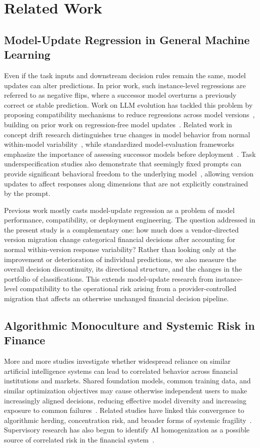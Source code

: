 \documentclass{ieeeaccess}
\begin{document}
\section{Related Work}
\subsection{Model-Update Regression in General Machine Learning}
Even if the task inputs and downstream decision rules remain the same, model updates can alter predictions. In prior work, such instance-level regressions are referred to as negative flips, where a successor model overturns a previously correct or stable prediction. Work on LLM evolution has tackled this problem by proposing compatibility mechanisms to reduce regressions across model versions~\cite{muscle}, building on prior work on regression-free model updates~\cite{pctrain}. Related work in concept drift research distinguishes true changes in model behavior from normal within-model variability~\cite{gama}, while standardized model-evaluation frameworks emphasize the importance of assessing successor models before deployment~\cite{helm}. Task underspecification studies also demonstrate that seemingly fixed prompts can provide significant behavioral freedom to the underlying model~\cite{underspec,sclar}, allowing version updates to affect responses along dimensions that are not explicitly constrained by the prompt.

Previous work mostly casts model-update regression as a problem of model performance, compatibility, or deployment engineering. The question addressed in the present study is a complementary one: how much does a vendor-directed version migration change categorical financial decisions after accounting for normal within-version response variability? Rather than looking only at the improvement or deterioration of individual predictions, we also measure the overall decision discontinuity, its directional structure, and the changes in the portfolio of classifications. This extends model-update research from instance-level compatibility to the operational risk arising from a provider-controlled migration that affects an otherwise unchanged financial decision pipeline.

\subsection{Algorithmic Monoculture and Systemic Risk in Finance}
More and more studies investigate whether widespread reliance on similar artificial intelligence systems can lead to correlated behavior across financial institutions and markets. Shared foundation models, common training data, and similar optimization objectives may cause otherwise independent users to make increasingly aligned decisions, reducing effective model diversity and increasing exposure to common failures~\cite{monoculture,kim}. Related studies have linked this convergence to algorithmic herding, concentration risk, and broader forms of systemic fragility~\cite{systemic,homog}. Supervisory research has also begun to identify AI homogenization as a possible source of correlated risk in the financial system~\cite{esrb,fsb}.
\end{document}
